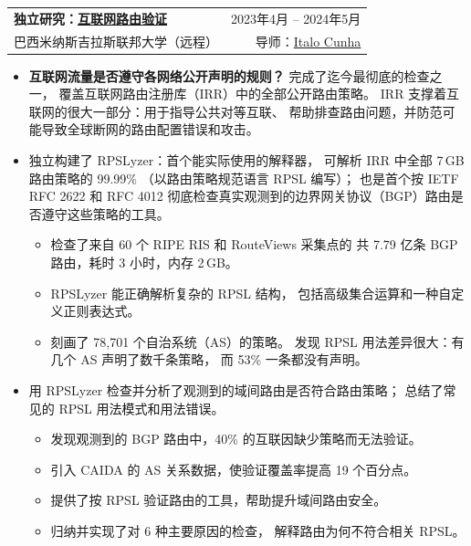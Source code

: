 \documentclass[letterpaper,11pt]{article}
\makeatletter
\newcommand{\CVItem}[1]{
  \item{\small
    {#1}
  }
}
\newcommand{\CVSubheadingFrame}[1]{
  \item
    \begin{tabular*}{0.97\textwidth}[t]{l@{\extracolsep{\fill}}r}
        #1
    \end{tabular*}
}
\newcommand{\CVSubheading}[4]{\CVSubheadingFrame
    {\textbf{#1} & #2 \\
        \small#3 & #4 \\
    }}
\newcommand{\CVItemListStart}{\begin{itemize}}
\newcommand{\CVItemListEnd}{\end{itemize}}
\newcommand{\uhref}[2]{\href{#1}{\textcolor{darkbluepurple}{#2}}}
\makeatother
\begin{document}
\CVSubheading {独立研究：\uhref
    {https://github.com/SichangHe/internet_route_verification}
    {互联网路由验证}
}{2023年4月 -- 2024年5月} {巴西米纳斯吉拉斯联邦大学（远程）}
{导师：\uhref{https://cunha.github.io/about/}{Italo Cunha}}
\CVItemListStart
\CVItem {\textbf{互联网流量是否遵守各网络公开声明的规则？}
    完成了迄今最彻底的检查之一，
    覆盖互联网路由注册库（IRR）中的全部公开路由策略。
    IRR 支撑着互联网的很大一部分：用于指导公共对等互联、
    帮助排查路由问题，并防范可能导致全球断网的路由配置错误和攻击。
}
\CVItem {独立构建了 RPSLyzer：首个能实际使用的解释器，
    可解析 IRR 中全部 7\,GB 路由策略的 99.99\%
    （以路由策略规范语言 RPSL 编写）；
    也是首个按 IETF RFC 2622 和 RFC 4012
    彻底检查真实观测到的边界网关协议（BGP）路由是否遵守这些策略的工具。
    \begin{itemize}
        \item 检查了来自 60 个 RIPE RIS 和 RouteViews 采集点的
        共 7.79 亿条 BGP 路由，耗时 3 小时，内存 2\,GB。
        \item RPSLyzer 能正确解析复杂的 RPSL 结构，
        包括高级集合运算和一种自定义正则表达式。
        \item 刻画了 78,701 个自治系统（AS）的策略。
        发现 RPSL 用法差异很大：有几个 AS 声明了数千条策略，
        而 53\% 一条都没有声明。
    \end{itemize}
}
\CVItem {用 RPSLyzer 检查并分析了观测到的域间路由是否符合路由策略；
    总结了常见的 RPSL 用法模式和用法错误。
    \begin{itemize}
        \item 发现观测到的 BGP 路由中，40\% 的互联因缺少策略而无法验证。
        \item 引入 CAIDA 的 AS 关系数据，使验证覆盖率提高 19 个百分点。
        \item 提供了按 RPSL 验证路由的工具，帮助提升域间路由安全。
        \item 归纳并实现了对 6 种主要原因的检查，
        解释路由为何不符合相关 RPSL。
    \end{itemize}
}
\CVItemListEnd
\end{document}
